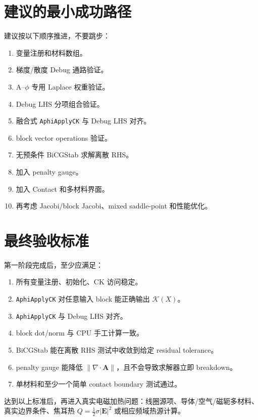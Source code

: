 \documentclass[UTF8,a4paper,11pt]{ctexart}
\newcommand{\code}[1]{\texttt{#1}}
\newcommand{\Kop}{\mathcal K}
\begin{document}
\section{建议的最小成功路径}

建议按以下顺序推进，不要跳步：

\begin{enumerate}
  \item 变量注册和材料数组。
  \item 梯度/散度 Debug 通路验证。
  \item A--$\phi$ 专用 Laplace 权重验证。
  \item Debug LHS 分项组合验证。
  \item 融合式 \code{AphiApplyCK} 与 Debug LHS 对齐。
  \item block vector operations 验证。
  \item 无预条件 BiCGStab 求解离散 RHS。
  \item 加入 penalty gauge。
  \item 加入 Contact 和多材料界面。
  \item 再考虑 Jacobi/block Jacobi、mixed saddle-point 和性能优化。
\end{enumerate}

\section{最终验收标准}

第一阶段完成后，至少应满足：
\begin{enumerate}
  \item 所有变量注册、初始化、CK 访问稳定。
  \item \code{AphiApplyCK} 对任意输入 block 能正确输出 $\Kop(X)$。
  \item \code{AphiApplyCK} 与 Debug LHS 对齐。
  \item block dot/norm 与 CPU 手工计算一致。
  \item BiCGStab 能在离散 RHS 测试中收敛到给定 residual tolerance。
  \item penalty gauge 能降低 $\|\nabla\cdot\bm A\|$，且不会导致求解器立即 breakdown。
  \item 单材料和至少一个简单 contact boundary 测试通过。
\end{enumerate}

达到以上标准后，再进入真实电磁加热问题：线圈源项、导体/空气/磁轭多材料、真实边界条件、焦耳热 $Q=\frac12\sigma|\bm E|^2$ 或相应频域热源计算。
\end{document}
